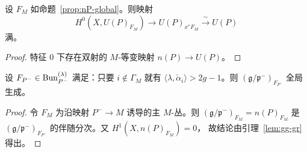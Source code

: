 \begin{corollary}
\label{cor:UP-surj}
设 $F_M$ 如命题~\ref{prop:nP-global}。则映射
\[
H^0(X,U(P)_{F_M})\to U(P)_{x^*F_M}\xrightarrow{\ \sim\ }U(P)
\]
满。
\end{corollary}

\begin{proof}
特征 $0$ 下存在双射的 $M$-等变映射 $n(P)\to U(P)$。
\end{proof}

\begin{corollary}
\label{cor:gp-global}
设 $F_{P^-}\in \mathrm{Bun}^{(\lambda)}_{P^-}$ 满足：只要 $i\notin \Gamma_M$ 就有
$\langle\lambda,\check\alpha_i\rangle>2g-1$。则 $(\mathfrak{g}/\mathfrak{p}^-)_{F_{P^-}}$
全局生成。
\end{corollary}

\begin{proof}
令 $F_M$ 为沿映射 $P^-\to M$ 诱导的主 $M$-丛。则
$(\mathfrak{g}/\mathfrak{p}^-)_{F_M}=n(P)_{F_M}$ 是
$(\mathfrak{g}/\mathfrak{p}^-)_{F_{P^-}}$ 的伴随分次。又 $H^1(X,n(P)_{F_M})=0$，
故结论由引理~\ref{lem:gg-gr} 得出。
\end{proof}
